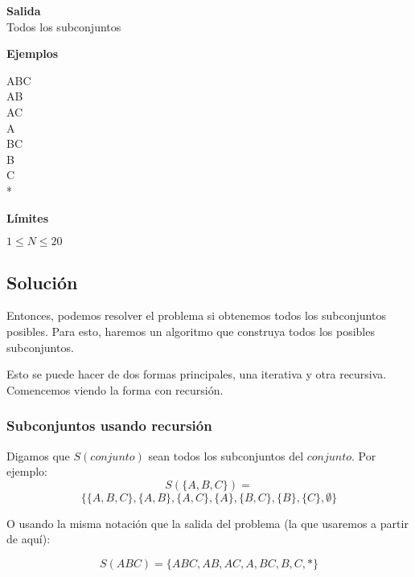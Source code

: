 \textbf{Salida}\\
Todos los subconjuntos

\textbf{Ejemplos}\\
\begin{casebox2}
	
	\hline
\end{casebox2}

\begin{casebox2}
	{
		ABC \\
		AB \\
		AC\\
		A\\
		BC\\
		B\\
		C\\
		* \\
	}
	\hline
\end{casebox2}

\textbf{Límites}
\begin{plimits}
	\item \(1\leq N \leq 20 \)
\end{plimits}

\subsection*{Solución}

Entonces, podemos resolver el problema si obtenemos todos los subconjuntos posibles. Para esto, haremos un algoritmo que construya todos los posibles subconjuntos.

Esto se puede hacer de dos formas principales, una iterativa y otra recursiva. Comencemos viendo la forma con recursión.

\subsubsection* {Subconjuntos usando recursión}

Digamos que \(S(conjunto)\) sean todos los subconjuntos del \(conjunto\). Por ejemplo:
\[S(\{A,B,C\})=\]
\[\{\{A,B,C\},\{A,B\},	\{A,C\},\{A\},\{B,C\},	\{B\},\{C\},	\emptyset\} \]

O usando la misma notación que la salida del problema (la que usaremos a partir de aquí):

\[S(ABC)=\{ABC, AB, AC, A, BC, B, C, * \}\]

